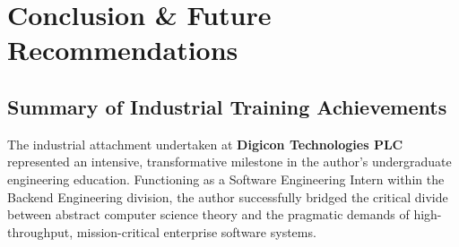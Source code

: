 \chapter{Conclusion \& Future Recommendations}
\label{ch:conclusion_future_work}

\section{Summary of Industrial Training Achievements}
\label{sec:conclusion_summary}

The industrial attachment undertaken at \textbf{Digicon Technologies PLC} represented an intensive, transformative milestone in the author's undergraduate engineering education. Functioning as a Software Engineering Intern within the Backend Engineering division, the author successfully bridged the critical divide between abstract computer science theory and the pragmatic demands of high-throughput, mission-critical enterprise software systems.

